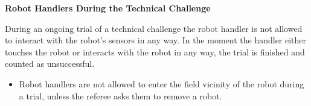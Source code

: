 \bigskip

{\bfseries Robot Handlers During the Technical Challenge}

\headlinebox

During an ongoing trial of a technical challenge the robot handler is not allowed to interact with the robot's sensors in any way. In the moment the handler either touches the robot or interacts with the robot in any way, the trial is finished and counted as unsuccessful.

\begin{itemize}
\item {} Robot handlers are not allowed to enter
      the field vicinity of the robot during a trial,
      unless the referee asks them to remove a robot.
\end{itemize}

